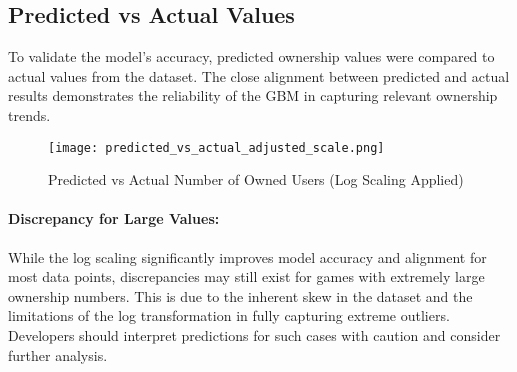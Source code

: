\documentclass{article}
\begin{document}
\subsection{Predicted vs Actual Values}
To validate the model's accuracy, predicted ownership values were compared to actual values from the dataset. The close alignment between predicted and actual results demonstrates the reliability of the GBM in capturing relevant ownership trends.

\begin{figure}[H]
\centering
\texttt{[image: predicted\_vs\_actual\_adjusted\_scale.png]}
\caption{Predicted vs Actual Number of Owned Users (Log Scaling Applied)}
\label{fig:predicted_vs_actual}
\end{figure}

\paragraph{Discrepancy for Large Values:}
While the log scaling significantly improves model accuracy and alignment for most data points, discrepancies may still exist for games with extremely large ownership numbers. This is due to the inherent skew in the dataset and the limitations of the log transformation in fully capturing extreme outliers. Developers should interpret predictions for such cases with caution and consider further analysis.
\end{document}
